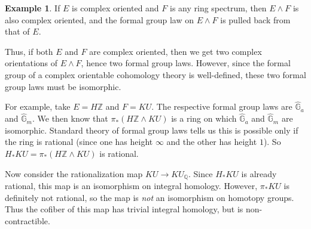 \documentclass{shortart}
\theoremstyle{definition}
\newtheorem{eg}[thm]{Example}
\newcommand\Q{\mathbb{Q}}
\newcommand\G{\mathbb{G}}
\newcommand\Z{\mathbb{Z}}
\begin{document}
\begin{eg}
  If $E$ is complex oriented and $F$ is any ring spectrum, then $E \wedge F$ is also complex oriented, and the formal group law on $E \wedge F$ is pulled back from that of $E$.

  Thus, if both $E$ and $F$ are complex oriented, then we get two complex orientations of $E \wedge F$, hence two formal group laws. However, since the formal group of a complex orientable cohomology theory is well-defined, these two formal group laws must be isomorphic.

  For example, take $E = H\Z$ and $F = KU$. The respective formal group laws are $\hat{\G}_a$ and $\hat{\G}_m$. We then know that $\pi_*(H\Z \wedge KU)$ is a ring on which $\hat{\G}_a$ and $\hat{\G}_m$ are isomorphic. Standard theory of formal group laws tells us this is possible only if the ring is rational (since one has height $\infty$ and the other has height $1$). So $H_*KU = \pi_*(H\Z \wedge KU)$ is rational.

  Now consider the rationalization map $KU \to KU_\Q$. Since $H_* KU$ is already rational, this map is an isomorphism on integral homology. However, $\pi_* KU$ is definitely not rational, so the map is \emph{not} an isomorphism on homotopy groups. Thus the cofiber of this map has trivial integral homology, but is non-contractible.
\end{eg}
\end{document}
